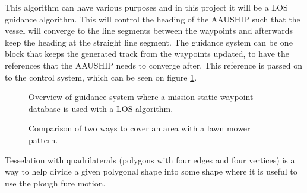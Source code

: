 This algorithm can have various purposes and in this project it will be a \ac{LOS} guidance algorithm. This will control the heading of the AAUSHIP such that the vessel will converge to the line segments between the waypoints and afterwards keep the heading at the straight line segment. The guidance system can be one block that keeps the generated track from the waypoints updated, to have the references that the AAUSHIP needs to converge after. This reference is passed on to the control system, which can be seen on figure \ref{fig:losguide}.
\begin{figure}[htbp]
	\centering
	
	\caption{Overview of guidance system where a mission static waypoint
	database is used with a \ac{LOS} algorithm.}
	\label{fig:losguide}
\end{figure}


\begin{figure}[htbp]
	\centering
	
	\caption{Comparison of two ways to cover an area with a lawn mower
	pattern.}
    \label{fig:use-case-polygon}
\end{figure}

Tesselation with quadrilaterals (polygons with four edges and four vertices) is a way to help divide a given polygonal shape into some shape where it is useful to use the plough fure motion.
